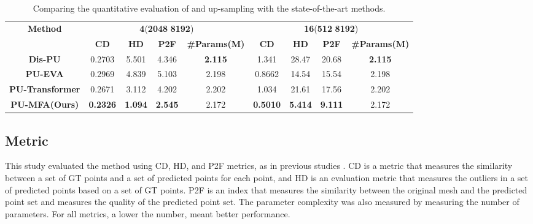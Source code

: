 \documentclass{article}
\begin{document}
\begin{table*}[htb!]
\centering
\resizebox{\textwidth}{!}
{\begin{tabular}{@{}c|cccc|cccc@{}}
\toprule
\multirow{2}{*}{\textbf{Method}} & \multicolumn{4}{c|}{\textbf{4}(\textbf{2048}  \textbf{8192})}                                       & \multicolumn{4}{c}{\textbf{16}(\textbf{512}  \textbf{8192})}                              \\ \cmidrule(l){2-9} 
                        & \textbf{CD}     & \textbf{HD}   & \textbf{P2F}   & \textbf{\#Params(M)} & \textbf{CD} & \textbf{HD} & \textbf{P2F} & \textbf{\#Params(M)} \\ \midrule
\textbf{Dis-PU}         & 0.2703          & 5.501          & 4.346          & \textbf{2.115}     & 1.341           & 28.47           & 20.68            & \textbf{2.115}                  \\
\textbf{PU-EVA}         & 0.2969           & 4.839              & 5.103              & 2.198              & 0.8662           & 14.54           & 15.54            & 2.198                  \\
\textbf{PU-Transformer} & 0.2671          & 3.112          & 4.202          & 2.202              & 1.034           & 21.61           & 17.56            & 2.202                  \\ \midrule
\textbf{PU-MFA(Ours)}           & \textbf{0.2326} & \textbf{1.094} & \textbf{2.545} & 2.172              & \textbf{0.5010}           & \textbf{5.414}           & \textbf{9.111}            & 2.172                  \\ \bottomrule
\end{tabular}}
\caption{Comparing the quantitative evaluation of  and  up-sampling with the state-of-the-art methods.}
\label{tab:pugan_test}
\end{table*}

\subsection{Metric}
\quad This study evaluated the method using CD, HD, and P2F metrics, as in previous studies \cite{li2021point,luo2021pu,qiu2021pu}. CD is a metric that measures the similarity between a set of GT  points and a set of predicted points for each point, and HD is an evaluation metric that measures the outliers in a set of predicted points based on a set of GT points. P2F is an index that measures the similarity between the original mesh and the predicted point set and measures the quality of the predicted point set. The parameter complexity was also measured by measuring the number of parameters. For all metrics, a lower the number, meant better performance.
\end{document}
